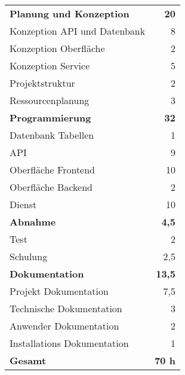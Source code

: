 
\begin{tabular}{lr}
\rowcolor{heading}\textbf{Planung und Konzeption} & \textbf{20} \\
Konzeption API und Datenbank & 8 \\
\rowcolor{odd}Konzeption Oberfläche & 2 \\
Konzeption Service & 5 \\
\rowcolor{odd}Projektstruktur & 2 \\
Ressourcenplanung & 3 \\

\rowcolor{heading}\textbf{Programmierung} & \textbf{32} \\
Datenbank Tabellen & 1 \\
\rowcolor{odd}API & 9 \\
Oberfläche Frontend & 10 \\
\rowcolor{odd}Oberfläche Backend & 2 \\
Dienst & 10 \\

\rowcolor{heading}\textbf{Abnahme} & \textbf{4,5} \\
Test & 2 \\
\rowcolor{odd}Schulung & 2,5 \\

\rowcolor{heading}\textbf{Dokumentation} & \textbf{13,5} \\
\rowcolor{odd}Projekt Dokumentation &  7,5\\
\rowcolor{odd}Technische Dokumentation & 3 \\
\rowcolor{odd}Anwender Dokumentation & 2 \\
\rowcolor{odd}Installations Dokumentation & 1 \\

\hline
\hline
\textbf{Gesamt} & \textbf{70 h} \\
\end{tabular}
